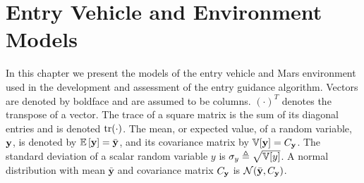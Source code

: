 \chapter{Entry Vehicle and Environment Models}\label{Ch:Models}
In this chapter we present the models of the entry vehicle and Mars environment used in the development and assessment of the entry guidance algorithm.
Vectors are denoted by boldface and are assumed to be columns. $(\cdot)^T$ denotes the transpose of a vector. 
The trace of a square matrix is the sum of its diagonal entries and is denoted $\mathrm{tr}(\cdot)$.   
The mean, or expected value, of a random variable, $\mathbf{y}$, is denoted by $\mathbb{E}\left[\mathbf{y}\right]=\bar{\mathbf{y}}$, and its covariance matrix by $\mathbb{V}[\mathbf{y}] = C_{\mathbf{y}}$. 
The standard deviation of a scalar random variable $y$ is $\sigma_{y} \triangleq \sqrt{\mathbb{V}[y]}$. A normal distribution with mean $\bar{\mathbf{y}}$ and covariance matrix $C_{\mathbf{y}}$ is $\mathcal{N}(\bar{\mathbf{y}}, C_{\mathbf{y}})$.

